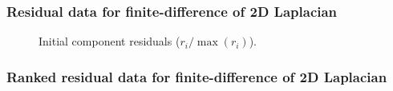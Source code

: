 \documentclass{beamer}
\begin{document}
\begin{frame}
	\frametitle{Residual data for finite-difference of 2D Laplacian}
	\begin{figure}[H]
		\centering
		\caption{Initial component residuals ($r_i / \max (r_i)$).}
		\label{fig:initial-residuals-laplacian}
	\end{figure}
\end{frame}

\begin{frame}
	\frametitle{Ranked residual data for finite-difference of 2D Laplacian}
	\begin{figure}[H]
		\centering
	\end{figure}
\end{frame}
\end{document}

